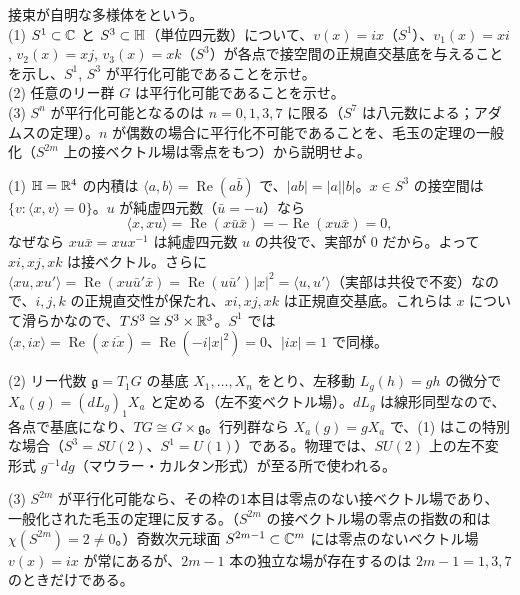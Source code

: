 \begin{problem}[難易度 A]\label{ch07-prob-parallel}
接束が自明な多様体をという。\\
(1) $S^1\subset\mathbb{C}$ と $S^3\subset\mathbb{H}$（単位四元数）について、$v(x)=ix$（$S^1$）、$v_1(x)=xi$, $v_2(x)=xj$, $v_3(x)=xk$（$S^3$）が各点で接空間の正規直交基底を与えることを示し、$S^1$, $S^3$ が平行化可能であることを示せ。\\
(2) 任意のリー群 $G$ は平行化可能であることを示せ。\\
(3) $S^n$ が平行化可能となるのは $n=0,1,3,7$ に限る（$S^7$ は八元数による；アダムスの定理）。$n$ が偶数の場合に平行化不可能であることを、毛玉の定理の一般化（$S^{2m}$ 上の接ベクトル場は零点をもつ）から説明せよ。
\end{problem}

\begin{solution}
(1) $\mathbb{H}=\mathbb{R}^4$ の内積は $\langle a,b\rangle=\operatorname{Re}(a\bar b)$ で、$\lvert ab\rvert=\lvert a\rvert\lvert b\rvert$。$x\in S^3$ の接空間は $\{v:\langle x,v\rangle=0\}$。$u$ が純虚四元数（$\bar u=-u$）なら
\[
\langle x,xu\rangle=\operatorname{Re}(x\bar u\bar x)=-\operatorname{Re}(xu\bar x)=0,
\]
なぜなら $xu\bar x=xux^{-1}$ は純虚四元数 $u$ の共役で、実部が $0$ だから。よって $xi,xj,xk$ は接ベクトル。さらに $\langle xu,xu'\rangle=\operatorname{Re}(xu\bar u'\bar x)=\operatorname{Re}(u\bar u')\lvert x\rvert^2=\langle u,u'\rangle$（実部は共役で不変）なので、$i,j,k$ の正規直交性が保たれ、$xi,xj,xk$ は正規直交基底。これらは $x$ について滑らかなので、$TS^3\cong S^3\times\mathbb{R}^3$。$S^1$ では $\langle x,ix\rangle=\operatorname{Re}(x\,\overline{ix})=\operatorname{Re}(-i\lvert x\rvert^2)=0$、$\lvert ix\rvert=1$ で同様。

(2) リー代数 $\mathfrak g=T_1G$ の基底 $X_1,\dots,X_n$ をとり、左移動 $L_g(h)=gh$ の微分で $X_a(g)=(dL_g)_1X_a$ と定める（左不変ベクトル場）。$dL_g$ は線形同型なので、各点で基底になり、$TG\cong G\times\mathfrak g$。行列群なら $X_a(g)=gX_a$ で、(1) はこの特別な場合（$S^3=SU(2)$、$S^1=U(1)$）である。物理では、$SU(2)$ 上の左不変形式 $g^{-1}dg$（マウラー・カルタン形式）が至る所で使われる。

(3) $S^{2m}$ が平行化可能なら、その枠の1本目は零点のない接ベクトル場であり、一般化された毛玉の定理に反する。（$S^{2m}$ の接ベクトル場の零点の指数の和は $\chi(S^{2m})=2\neq0$。）奇数次元球面 $S^{2m-1}\subset\mathbb{C}^m$ には零点のないベクトル場 $v(x)=ix$ が常にあるが、$2m-1$ 本の独立な場が存在するのは $2m-1=1,3,7$ のときだけである。
\end{solution}


